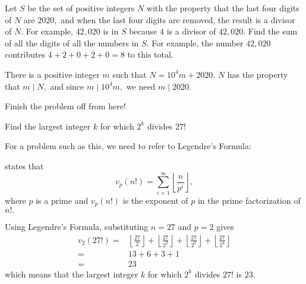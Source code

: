 \documentclass[11pt,paper=letter]{scrartcl}
\begin{document}
\begin{exboxed}[AIME I 2020/4]
Let $S$ be the set of positive integers $N$ with the property that the last four digits of $N$ are $2020,$ and when the last four digits are removed, the result is a divisor of $N.$ For example, $42,020$ is in $S$ because $4$ is a divisor of $42,020.$ Find the sum of all the digits of all the numbers in $S.$ For example, the number $42,020$ contributes $4+2+0+2+0=8$ to this total.
\end{exboxed}
There is a positive integer $m$ such that $N = 10^4m + 2020.$ $N$ has the property that $m \mid N,$ and since $m \mid 10^4m,$ we need $m \mid 2020.$ 

\begin{exercise}
    Finish the problem off from here!
\end{exercise}
    

\begin{exboxed}
Find the largest integer $k$ for which $2^k$ divides $27!$
\end{exboxed}
For a problem such as this, we need to refer to Legendre's Formula:

\begin{probboxed}
 states that \[v_p(n!)=\sum_{i=1}^{\infty} \left\lfloor \dfrac{n}{p^i}\right\rfloor,\] where $p$ is a prime and $v_p(n!)$ is the exponent of $p$ in the prime factorization of $n!.$
\end{probboxed}
Using Legendre's Formula, substituting $n=27$ and $p=2$ gives
\begin{align*}v_2(27!)=&\left\lfloor\frac{27}{2}\right\rfloor+\left\lfloor\frac{27}{2^2}\right\rfloor+\left\lfloor\frac {27}{2^3}\right\rfloor+\left\lfloor\frac{27}{2^4}\right\rfloor\\
=& 13+6+3+1\\
=& 23\end{align*}
which means that the largest integer $k$ for which $2^k$ divides $27!$ is $\boxed{23}$.
\end{document}
